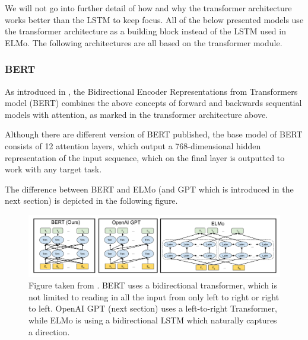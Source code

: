 \documentclass[a4paper,12pt,twoside,openright]{report}
\begin{document}
We will not go into further detail of how and why the transformer architecture works better than the LSTM to keep focus.
All of the below presented models use the transformer architecture as a building block instead of the LSTM used in ELMo.
The following architectures are all based on the transformer module.

\subsubsection{BERT}\label{section:BERT}
 
As introduced in \cite{devlin18}, the Bidirectional Encoder Representations from Transformers model (BERT) combines the above concepts of forward and backwards sequential models with attention, as marked in the transformer architecture above.

Although there are different version of BERT published, the base model of BERT consists of 12 attention layers, which output a 768-dimensional hidden representation of the input sequence, which on the final layer is outputted to work with any target task.

The difference between BERT and ELMo (and GPT which is introduced in the next section) is depicted in the following figure.

\begin{figure}[H]
	\center
  \includegraphics[width=\linewidth]{./assets/background/BERT_GPT_ELMo.png}
  \caption{Figure taken from \cite{devlin18}. BERT uses a bidirectional transformer, which is not limited to reading in all the input from only left to right or right to left. OpenAI GPT (next section) uses a left-to-right Transformer, while ELMo is using a bidirectional LSTM which naturally captures a direction. }
  \label{fig:attention_is_all_you_need}
\end{figure}

\end{document}
